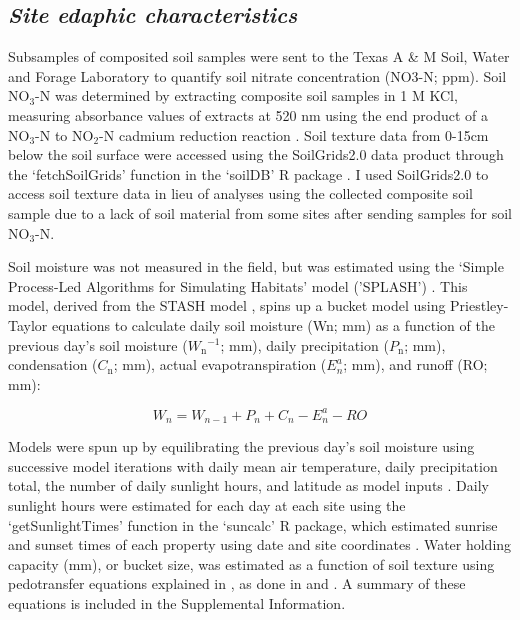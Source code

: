 \subsection{\textit{Site edaphic characteristics}}
Subsamples of composited soil samples were sent to the Texas A \& M Soil, Water and Forage Laboratory to quantify soil nitrate concentration (NO3-N; ppm). Soil NO$_{3}$-N was determined by extracting composite soil samples in 1 M KCl, measuring absorbance values of extracts at 520 nm using the end product of a NO$_{3}$-N to NO$_{2}$-N cadmium reduction reaction . Soil texture data from 0-15cm below the soil surface were accessed using the SoilGrids2.0 data product  through the ‘fetchSoilGrids’ function in the ‘soilDB’ R package . I used SoilGrids2.0 to access soil texture data in lieu of analyses using the collected composite soil sample due to a lack of soil material from some sites after sending samples for soil NO$_{3}$-N.

Soil moisture was not measured in the field, but was estimated using the ‘Simple Process-Led Algorithms for Simulating Habitats’ model ('SPLASH') . This model, derived from the STASH model , spins up a bucket model using Priestley-Taylor equations  to calculate daily soil moisture (Wn; mm) as a function of the previous day’s soil moisture ($W_\mathrm{n}{}^{-1}$; mm), daily precipitation ($P_\mathrm{n}$; mm), condensation ($C_\mathrm{n}$; mm), actual evapotranspiration ($E_{n}^a$; mm), and runoff (RO; mm):

\begin{equation}
    \label{eq_4.7}
    W_n = W_{n-1} + P_n + C_n - E_{n}^{a} - RO
\end{equation}

Models were spun up by equilibrating the previous day’s soil moisture using successive model iterations with daily mean air temperature, daily precipitation total, the number of daily sunlight hours, and latitude as model inputs . Daily sunlight hours were estimated for each day at each site using the ‘getSunlightTimes’ function in the ‘suncalc’ R package, which estimated sunrise and sunset times of each property using date and site coordinates . Water holding capacity (mm), or bucket size, was estimated as a function of soil texture using pedotransfer equations explained in , as done in  and . A summary of these equations is included in the Supplemental Information.

